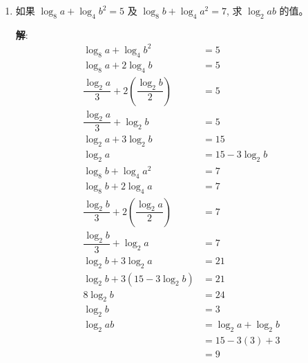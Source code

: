 \documentclass{report}
\newcommand{\sol}{\vspace{0.2cm}\textbf{解}:}
\begin{document}
\begin{multicols*}{2}
\begin{enumerate}[leftmargin=*]
        \item 如果 $\log _8 a+\log _4 b^2=5$ 及 $\log _8 b+\log _4 a^2=7$, 求 $\log _2 a b$ 的值。

              \sol{}
              \begin{align*}
                  \log_8 a + \log_4 b^2                                   & = 5                   \\
                  \log_8 a + 2 \log_4 b                                   & = 5                   \\
                  \dfrac{\log_2 a}{3} + 2\left(\dfrac{\log_2 b}{2}\right) & = 5                   \\
                  \dfrac{\log_2 a}{3} + \log_2 b                          & = 5                   \\
                  \log_2 a + 3 \log_2 b                                   & = 15                  \\
                  \log_2 a                                                & = 15 - 3 \log_2 b     \\
                  \log_8 b + \log_4 a^2                                   & = 7                   \\
                  \log_8 b + 2 \log_4 a                                   & = 7                   \\
                  \dfrac{\log_2 b}{3} + 2\left(\dfrac{\log_2 a}{2}\right) & = 7                   \\
                  \dfrac{\log_2 b}{3} + \log_2 a                          & = 7                   \\
                  \log_2 b + 3 \log_2 a                                   & = 21                  \\
                  \log_2 b + 3 \left(15 - 3 \log_2 b\right)               & = 21                  \\
                  8 \log_2 b                                              & = 24                  \\
                  \log_2 b                                                & = 3                   \\
                  \log_2 ab                                               & = \log_2 a + \log_2 b \\
                                                                          & = 15 - 3(3) + 3       \\
                                                                          & = 9
              \end{align*}


\end{enumerate}
\end{multicols*}
\end{document}
